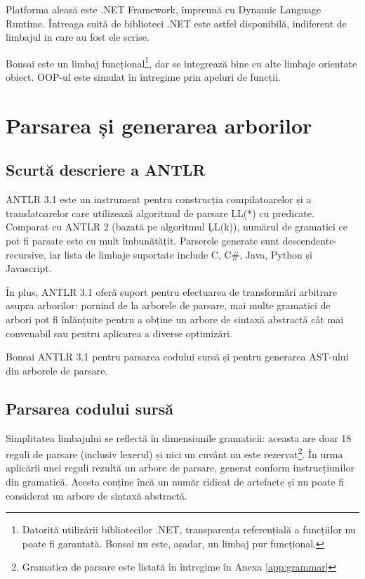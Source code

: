 \documentclass[12pt,a4paper]{memoir}
\begin{document}
Platforma aleasă este .NET Framework, împreună cu Dynamic Language Runtime. Întreaga suită de biblioteci .NET este astfel disponibilă, indiferent de limbajul in care au fost ele scrise. 

Bonsai este un limbaj funcțional\footnote{Datorită utilizării bibliotecilor .NET, transparența referențială a funcțiilor nu poate fi garantată. Bonsai nu este, așadar, un limbaj pur funcțional.}, dar se integrează bine cu alte limbaje orientate obiect. OOP-ul este simulat în întregime prin apeluri de funcții.

\chapter{Parsarea și generarea arborilor}

\section{Scurtă descriere a ANTLR}

ANTLR 3.1\cite{antlr} este un instrument pentru construcția compilatoarelor și a translatoarelor care utilizează algoritmul de parsare \c{LL(*)} cu predicate\cite{definitive_antlr_reference}. Comparat cu ANTLR 2 (bazată pe algoritmul \c{LL(k)}), numărul de gramatici ce pot fi parsate este cu mult îmbunătățit. Parserele generate sunt descendente-recursive, iar lista de limbaje suportate\cite{antlr_targets} include C, C\#, Java, Python și Javascript.

În plus, ANTLR 3.1 oferă suport pentru efectuarea de transformări arbitrare asupra arborilor: pornind de la arborele de parsare, mai multe gramatici de arbori pot fi înlănțuite pentru a obține un arbore de sintaxă abstractă cât mai convenabil sau pentru aplicarea a diverse optimizări\cite{antlr_tree_grammars}.

Bonsai ANTLR 3.1 pentru parsarea codului sursă și pentru generarea AST-ului din arborele de parsare. 

\section{Parsarea codului sursă}

Simplitatea limbajului se reflectă în dimensiunile gramaticii: aceasta are doar 18 reguli de parsare (inclusiv lexerul) și nici un cuvânt nu este rezervat\footnote{Gramatica de parsare este listată în întregime în Anexa \ref{app:grammar}}. În urma aplicării unei reguli rezultă un arbore de parsare, generat conform instrucțiunilor din gramatică. Acesta conține încă un număr ridicat de artefacte și nu poate fi considerat un arbore de sintaxă abstractă.
\end{document}
